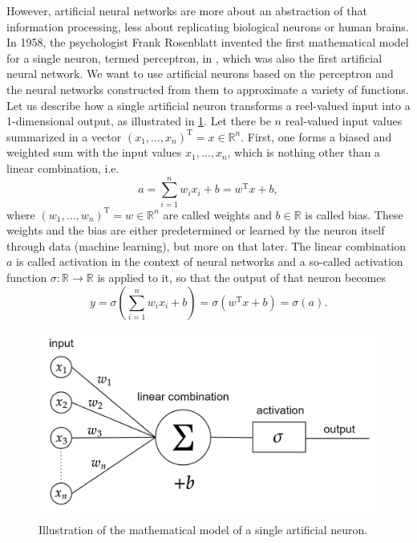 However, artificial neural networks are more about an abstraction of that information processing, less about replicating biological neurons or human brains. In 1958, the psychologist Frank Rosenblatt invented the first mathematical model for a single neuron, termed perceptron, in \cite{Rosenblatt:1958}, which was also the first artificial neural network. We want to use artificial neurons based on the perceptron and the neural networks constructed from them to approximate a variety of functions. \\
Let us describe how a single artificial neuron transforms a reel-valued input into a 1-dimensional output, as illustrated in \cref{fig4}. Let there be $n$ real-valued input values summarized in a vector $(x_1, \ldots, x_n)^{\mathrm{T}} = x \in \mathbb{R}^n$. First, one forms a biased and weighted sum with the input values $x_1, \ldots, x_n$, which is nothing other than a linear combination, i.e. 
\begin{equation*}
    a = \sum^{n}_{i=1} w_i x_i + b = w^{\mathrm{T}} x + b,
\end{equation*}
where $(w_1, \ldots, w_n)^{\mathrm{T}} = w \in \mathbb{R}^n$ are called weights and $b \in \mathbb{R}$ is called bias. These weights and the bias are either predetermined or learned by the neuron itself through data (machine learning), but more on that later. The linear combination $a$ is called activation in the context of neural networks and a so-called activation function $\sigma \colon \mathbb{R} \to \mathbb{R}$ is applied to it, so that the output of that neuron becomes
\begin{equation*}
    y = \sigma \left( \sum^{n}_{i=1} w_i x_i + b \right) = \sigma \left( w^{\mathrm{T}} x + b \right) = \sigma(a).
\end{equation*}

\begin{figure}[H]
    \begin{center}
        \includegraphics[scale=0.25]{img/diagram-20220205_1.png}
    \end{center}
    \caption{Illustration of the mathematical model of a single artificial neuron.}
    \label{fig4}
\end{figure}

